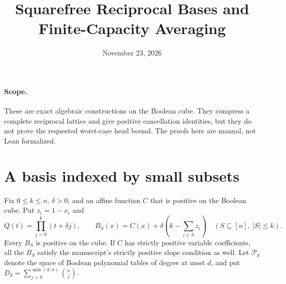 \documentclass[11pt]{article}
\title{Squarefree Reciprocal Bases and Finite-Capacity Averaging}
\author{}
\date{November 23, 2026}
\begin{document}
\maketitle

\paragraph{Scope.}
These are exact algebraic constructions on the Boolean cube. They
compress a complete reciprocal lattice and give positive cancellation
identities, but they do not prove the requested worst-case head bound.
The proofs here are manual, not Lean formalized.

\section{A basis indexed by small subsets}

Fix $0\le k\le n$, $\delta>0$, and an affine function $C$ that is
positive on the Boolean cube. Put $z_i=1-x_i$ and
\[
 Q(t)=\prod_{j=0}^k(t+\delta j),\qquad
 B_S(x)=C(x)+\delta\left(k-\sum_{i\in S}z_i\right)
          \quad (S\subseteq[n],\ |S|\le k).
 \tag{1}
\]
Every $B_S$ is positive on the cube. If $C$ has strictly positive
variable coefficients, all the $B_S$ satisfy the manuscript's
strictly positive slope condition as well. Let $\mathcal P_d$
denote the space of Boolean polynomial tables of degree at most $d$,
and put $D_d=\sum_{j=0}^{\min(d,n)}\binom nj$.
\end{document}
